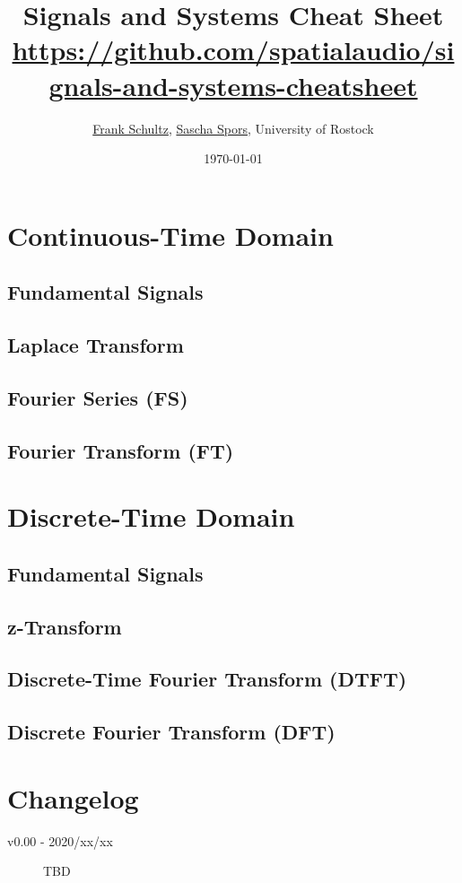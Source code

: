 \documentclass[landscape,columns=4]{cheatsheet}
\title{Signals and Systems Cheat Sheet\\
\tiny{\url{https://github.com/spatialaudio/signals-and-systems-cheatsheet}}}
\author{
\href{mailto:frank.schultz@uni-rostock.de}{Frank Schultz},
\href{mailto:sascha.spors@uni-rostock.de}{Sascha Spors},
University of Rostock
}
\date{\today}
\begin{document}
\maketitle

\section{Continuous-Time Domain}

\subsection{Fundamental Signals}

\subsection{Laplace Transform}

\subsection{Fourier Series (FS)}

\subsection{Fourier Transform (FT)}




\section{Discrete-Time Domain}

\subsection{Fundamental Signals}

\subsection{z-Transform}

\subsection{Discrete-Time Fourier Transform (DTFT)}

\subsection{Discrete Fourier Transform (DFT)}


\section{Changelog}
\begin{description}
\item[v0.00 - 2020/xx/xx] TBD
\end{description}
\end{document}
